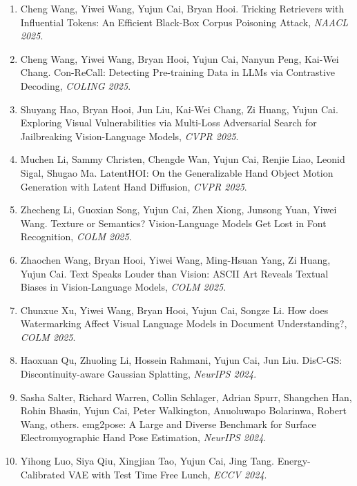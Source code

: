 \begin{enumerate}
\item Cheng Wang, Yiwei Wang, Yujun Cai, Bryan Hooi. Tricking Retrievers with Influential Tokens: An Efficient Black-Box Corpus Poisoning Attack, \textit{NAACL 2025}.

\item Cheng Wang, Yiwei Wang, Bryan Hooi, Yujun Cai, Nanyun Peng, Kai-Wei Chang. Con-ReCall: Detecting Pre-training Data in LLMs via Contrastive Decoding, \textit{COLING 2025}.

\item Shuyang Hao, Bryan Hooi, Jun Liu, Kai-Wei Chang, Zi Huang, Yujun Cai. Exploring Visual Vulnerabilities via Multi-Loss Adversarial Search for Jailbreaking Vision-Language Models, \textit{CVPR 2025}.

\item Muchen Li, Sammy Christen, Chengde Wan, Yujun Cai, Renjie  Liao, Leonid Sigal, Shugao Ma. LatentHOI: On the Generalizable Hand Object Motion Generation with Latent Hand Diffusion, \textit{CVPR 2025}.

\item Zhecheng Li, Guoxian Song, Yujun Cai, Zhen Xiong, Junsong Yuan, Yiwei Wang. Texture or Semantics? Vision-Language Models Get Lost in Font Recognition, \textit{COLM 2025}.

\item Zhaochen Wang, Bryan Hooi, Yiwei Wang, Ming-Hsuan Yang, Zi Huang, Yujun Cai. Text Speaks Louder than Vision: ASCII Art Reveals Textual Biases in Vision-Language Models, \textit{COLM 2025}.

\item Chunxue Xu, Yiwei Wang, Bryan Hooi, Yujun Cai, Songze Li. How does Watermarking Affect Visual Language Models in Document Understanding?, \textit{COLM 2025}.

\item Haoxuan Qu, Zhuoling Li, Hossein Rahmani, Yujun Cai, Jun Liu. DisC-GS: Discontinuity-aware Gaussian Splatting, \textit{NeurIPS 2024}.

\item Sasha Salter, Richard Warren, Collin Schlager, Adrian Spurr, Shangchen Han, Rohin Bhasin, Yujun Cai, Peter Walkington, Anuoluwapo Bolarinwa, Robert Wang, others. emg2pose: A Large and Diverse Benchmark for Surface Electromyographic Hand Pose Estimation, \textit{NeurIPS 2024}.

\item Yihong Luo, Siya Qiu, Xingjian Tao, Yujun Cai, Jing Tang. Energy-Calibrated VAE with Test Time Free Lunch, \textit{ECCV 2024}.


\end{enumerate}
